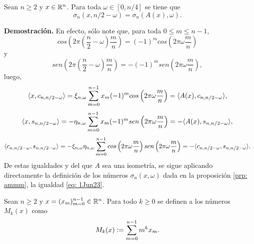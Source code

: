 \begin{prop}
\label{prop: operaodr de alternancia y sigmas}
Sean $n \geq 2$ y $x \in \mathbb{R}^{n}$. 
Para toda $\omega \in [0, n/4]$ se tiene que
\begin{equation}
	\label{eq: 1Jun23}
	\sigma_{n}(x, n/2-\omega) = \sigma_{n}(A(x), \omega).
\end{equation}
\end{prop}
\noindent
\textbf{Demostración.}
En efecto, sólo note que, para toda
$0 \leq m \leq n-1$,
\[
cos\left( 
2 \pi \left(
\frac{n}{2} - \omega
\right) \frac{m}{n}
\right) = 
(-1)^{m}
cos\left( 
2 \pi \omega \frac{m}{n}
\right)
\]
y 
\[
sen\left( 
2 \pi \left(
\frac{n}{2} - \omega
\right) \frac{m}{n}
\right) = 
-(-1)^{m}
sen\left( 
2 \pi \omega \frac{m}{n}
\right),
\]
luego, 
\[
\langle 
x, c_{n, n/2-\omega} 
\rangle
= 
\xi_{n, \omega} \sum\limits_{m=0}^{n-1}
x_{m}(-1)^{m} cos\left( 
2 \pi \omega \frac{m}{n}
\right)
 = \langle 
A(x), c_{n, n/2-\omega} 
\rangle,
\]
\[
\langle 
x, s_{n, n/2-\omega} 
\rangle
= 
-\eta_{n, \omega} \sum\limits_{m=0}^{n-1}
x_{m}(-1)^{m} sen\left( 
2 \pi \omega \frac{m}{n}
\right)
 = - \langle 
A(x), s_{n, n/2-\omega} 
\rangle,
\]
\[
\langle 
c_{n, n/2-\omega}, s_{n, n/2-\omega}
\rangle
= 
-\xi_{n, \omega} \eta_{n, \omega} \sum\limits_{m=0}^{n-1}
cos\left( 
2 \pi \omega \frac{m}{n}
\right) sen\left( 
2 \pi \omega \frac{m}{n}
\right)
 = - \langle 
c_{n, n/2-\omega}, s_{n, n/2-\omega}
\rangle.
\]
De estas igualdades y 
del que $A$ sea una isometría, se sigue aplicando
directamente
la definición de
los números $\sigma_{n}(x, \omega)$
dada en la proposición \ref{prp: ammm},
la igualdad \ref{eq: 1Jun23}.
\QEDB
\vspace{0.2cm}


\begin{defi}
\label{def: momentos de x}
Sean $n \geq 2$ y $x= (x_{m})_{m=0}^{n-1} \in \mathbb{R}^{n}$.
Para todo $k \geq 0$
se definen a los números $M_{k}(x)$ como
	\begin{equation}
	\label{eq: momento k esimo de x}
	M_{k}(x) := \sum\limits_{m=0}^{n-1}m^{k}x_{m}.
	\end{equation}
\end{defi}

